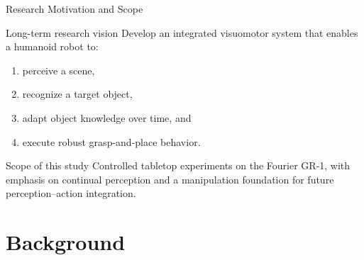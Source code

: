 \documentclass[12pt,aspectratio=169]{beamer}
\begin{document}
\begin{frame}{Research Motivation and Scope}
\begin{block}{Long-term research vision}
Develop an integrated visuomotor system that enables a humanoid robot to:
\begin{enumerate}
    \item perceive a scene,
    \item recognize a target object,
    \item adapt object knowledge over time, and
    \item execute robust grasp-and-place behavior.
\end{enumerate}
\end{block}

\vspace{-0.15cm}
\begin{alertblock}{Scope of this study}
Controlled tabletop experiments on the Fourier GR-1, 
with emphasis on continual perception and a manipulation foundation for future perception--action integration.
\end{alertblock}
\end{frame}



\section{Background}
\end{document}
